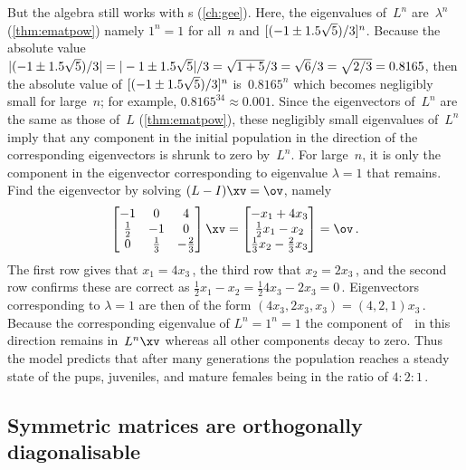 \begin{example}
\begin{solution}
But the algebra still works with s (\autoref{ch:gee}).
Here, the eigenvalues of~\(L^n\) are~\(\lambda^n\) (\autoref{thm:ematpow}) namely \(1^n=1\) for all~\(n\) and \([(-1\pm 1.5\sqrt5)/3]^n\).
Because the absolute value \(|(-1\pm 1.5\sqrt5)/3|
=|-1\pm 1.5\sqrt5|/3=\sqrt{1+5}/3=\sqrt{6}/3=\sqrt{2/3}=0.8165\), then the absolute value of \([(-1\pm 1.5\sqrt5)/3]^n\) is~\(0.8165^n\) which becomes negligibly small for large~\(n\); for example, \(0.8165^{34}\approx 0.001\).
Since the eigenvectors of~\(L^n\) are the same as those of~\(L\) (\autoref{thm:ematpow}), these negligibly small eigenvalues of~\(L^n\) imply that any component in the initial population in the direction of the corresponding eigenvectors is shrunk to zero by~\(L^n\).
For large~\(n\), it is only the component in the eigenvector corresponding to eigenvalue \(\lambda=1\) that remains.
Find the eigenvector by solving \((L-I)\xv=\ov\), namely
\begin{equation*}
\begin{bmatrix} -1&0&4\\\frac12&-1&0\\0&\frac13&-\frac23 \end{bmatrix}\xv=\begin{bmatrix} -x_1+4x_3\\ \frac12x_1-x_2\\\frac13x_2-\frac23x_3 \end{bmatrix}=\ov\,.
\end{equation*}
The first row gives that \(x_1=4x_3\)\,, the third row that \(x_2=2x_3\)\,, and the second row confirms these are correct as \(\frac12x_1-x_2=\frac124x_3-2x_3=0\)\,.
Eigenvectors corresponding to \(\lambda=1\) are then of the form \((4x_3,2x_3,x_3)=(4,2,1)x_3\)\,.
Because the corresponding eigenvalue of \(L^n=1^n=1\) the component of~\xv\ in this direction remains in~\(L^n\xv\) whereas all other components decay to zero.
Thus the model predicts that after many generations the population reaches a steady state of the pups, juveniles, and mature females being in the ratio of \(4:2:1\)\,.
\end{solution}
\end{example}





\subsection{Symmetric matrices are orthogonally diagonalisable}
\label{sec:smod}

